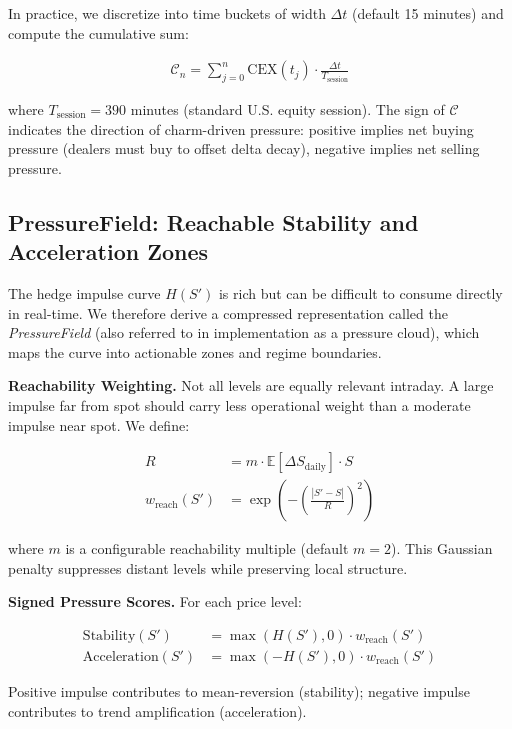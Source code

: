 \documentclass[11pt, a4paper]{article}
\begin{document}
In practice, we discretize into time buckets of width $\Delta t$ (default 15 minutes) and compute the cumulative sum:

\begin{align}
\mathcal{C}_n = \sum_{j=0}^{n} \text{CEX}(t_j) \cdot \frac{\Delta t}{T_{\text{session}}}
\end{align}

where $T_{\text{session}} = 390$ minutes (standard U.S. equity session). The sign of $\mathcal{C}$ indicates the direction of charm-driven pressure: positive implies net buying pressure (dealers must buy to offset delta decay), negative implies net selling pressure.

\subsection{PressureField: Reachable Stability and Acceleration Zones}
\label{subsec:pressure-field}

The hedge impulse curve $H(S')$ is rich but can be difficult to consume directly in real-time. We therefore derive a compressed representation called the \emph{PressureField} (also referred to in implementation as a pressure cloud), which maps the curve into actionable zones and regime boundaries.

\textbf{Reachability Weighting.} Not all levels are equally relevant intraday. A large impulse far from spot should carry less operational weight than a moderate impulse near spot. We define:

\begin{align}
R &= m \cdot \mathbb{E}[\Delta S_{\text{daily}}] \cdot S \\
w_{\text{reach}}(S') &= \exp\!\left(-\left(\frac{|S' - S|}{R}\right)^2\right)
\end{align}

where $m$ is a configurable reachability multiple (default $m=2$). This Gaussian penalty suppresses distant levels while preserving local structure.

\textbf{Signed Pressure Scores.} For each price level:

\begin{align}
\text{Stability}(S') &= \max(H(S'), 0) \cdot w_{\text{reach}}(S') \\
\text{Acceleration}(S') &= \max(-H(S'), 0) \cdot w_{\text{reach}}(S')
\end{align}

Positive impulse contributes to mean-reversion (stability); negative impulse contributes to trend amplification (acceleration).
\end{document}
